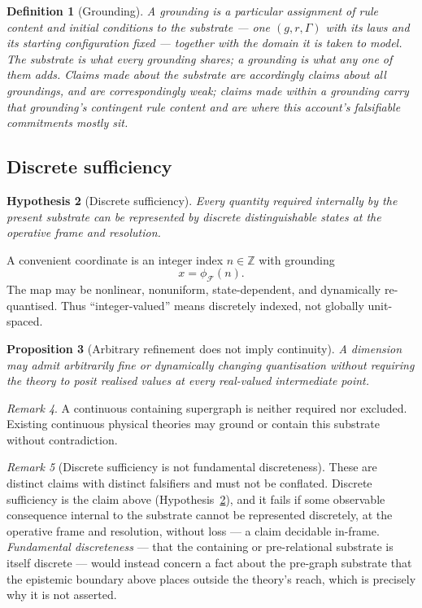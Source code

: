 \documentclass[11pt,a4paper]{article}
\newtheorem{definition}{Definition}[section]
\newtheorem{proposition}[definition]{Proposition}
\newtheorem{hypothesis}[definition]{Hypothesis}
\theoremstyle{remark}\newtheorem{remark}[definition]{Remark}
\begin{document}
\begin{definition}[Grounding]\label{def:grounding}
A \emph{grounding} is a particular assignment of rule content and initial conditions to the substrate
--- one $(g,r,\Gamma)$ with its laws and its starting configuration fixed --- together with the
domain it is taken to model. The substrate is what every grounding shares; a grounding is what any
one of them adds. Claims made about the substrate are accordingly claims about all groundings, and
are correspondingly weak; claims made within a grounding carry that grounding's contingent rule
content and are where this account's falsifiable commitments mostly sit.
\end{definition}

\subsection{Discrete sufficiency}\label{sec:discrete}
\begin{hypothesis}[Discrete sufficiency]\label{hyp:discrete}
Every quantity required internally by the present substrate can be represented by discrete distinguishable states at the operative frame and resolution.
\end{hypothesis}
A convenient coordinate is an integer index $n\in\mathbb Z$ with grounding
\[x=\phi_{\mathcal F}(n).\]
The map may be nonlinear, nonuniform, state-dependent, and dynamically re-quantised. Thus ``integer-valued'' means discretely indexed, not globally unit-spaced.

\begin{proposition}[Arbitrary refinement does not imply continuity]\label{prop:refinement}
A dimension may admit arbitrarily fine or dynamically changing quantisation without requiring the theory to posit realised values at every real-valued intermediate point.
\end{proposition}
\begin{remark}
A continuous containing supergraph is neither required nor excluded. Existing continuous physical theories may ground or contain this substrate without contradiction.
\end{remark}

\begin{remark}[Discrete sufficiency is not fundamental discreteness]
These are distinct claims with distinct falsifiers and must not be conflated. Discrete sufficiency is the claim above (Hypothesis~\ref{hyp:discrete}), and it fails if some observable consequence internal to the substrate cannot be represented discretely, at the operative frame and resolution, without loss --- a claim decidable in-frame. \emph{Fundamental discreteness} --- that the containing or pre-relational substrate is itself discrete --- would instead concern a fact about the pre-graph substrate that the epistemic boundary above places outside the theory's reach, which is precisely why it is not asserted.
\end{remark}
\end{document}

